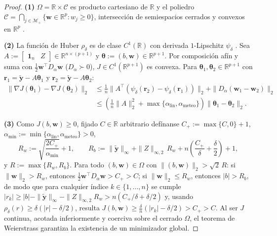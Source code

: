 \documentclass[11pt,a4paper]{article}
\begin{document}
\begin{proof}
\textbf{(1)} $\Omega = \mathbb{R} \times \mathcal{C}$ es producto cartesiano de $\mathbb{R}$ y el poliedro $\mathcal{C} = \bigcap_{j \in \mathcal{M}_+} \{\mathbf{w} \in \mathbb{R}^p : w_j \ge 0\}$, intersección de semiespacios cerrados y convexos en $\mathbb{R}^p$ \cite{boyd2004convex}.

\textbf{(2)} La función de Huber $\rho_\delta$ es de clase $C^1(\mathbb{R})$ con derivada $1$-Lipschitz $\psi_\delta$ \cite{huber1964}. Sea $A := \begin{bmatrix} \mathbf{1}_n & Z \end{bmatrix} \in \mathbb{R}^{n \times (p+1)}$ y $\boldsymbol{\theta} := (b, \mathbf{w}) \in \mathbb{R}^{p+1}$. Por composición afín y suma con $\frac{1}{2}\mathbf{w}^\top D_\alpha \mathbf{w}$ ($D_\alpha \succ 0$), $J \in C^1(\mathbb{R}^{p+1})$ es convexa. Para $\boldsymbol{\theta}_1, \boldsymbol{\theta}_2 \in \mathbb{R}^{p+1}$ con $\mathbf{r}_1 = \tilde{\mathbf{y}} - A\boldsymbol{\theta}_1$ y $\mathbf{r}_2 = \tilde{\mathbf{y}} - A\boldsymbol{\theta}_2$:
\begin{align*}
\|\nabla J(\boldsymbol{\theta}_1) - \nabla J(\boldsymbol{\theta}_2)\|_2
&\le \frac{1}{n}\|A^\top (\psi_\delta(\mathbf{r}_2) - \psi_\delta(\mathbf{r}_1))\|_2 + \|D_\alpha(\mathbf{w}_1 - \mathbf{w}_2)\|_2 \\
&\le \left(\frac{1}{n}\|A\|_2^2 + \max\{\alpha_{\mathrm{lin}}, \alpha_{\mathrm{meteo}}\}\right)\|\boldsymbol{\theta}_1 - \boldsymbol{\theta}_2\|_2.
\end{align*}

\textbf{(3)} Como $J(b,\mathbf{w}) \ge 0$, fijado $C \in \mathbb{R}$ arbitrario defínanse $C_+ := \max\{C, 0\} + 1$, $\alpha_{\min} := \min\{\alpha_{\mathrm{lin}}, \alpha_{\mathrm{meteo}}\} > 0$,
\[
R_w := \sqrt{\frac{2 C_+}{\alpha_{\min}}} + 1, \qquad
R_b := \|\tilde{\mathbf{y}}\|_\infty + \|Z\|_{\infty,2}\,R_w + n\left(\frac{C_+}{\delta} + \frac{\delta}{2}\right) + 1,
\]
y $R := \max\{R_w, R_b\}$. Para todo $(b, \mathbf{w}) \in \Omega$ con $\|(b, \mathbf{w})\|_2 > \sqrt{2}\,R$: si $\|\mathbf{w}\|_2 > R_w$, entonces $\frac{1}{2}\mathbf{w}^\top D_\alpha \mathbf{w} > C_+ > C$; si $\|\mathbf{w}\|_2 \le R_w$, entonces $|b| > R_b$, de modo que para cualquier índice $k \in \{1,\dots,n\}$ se cumple $|r_k| \ge |b| - \|\tilde{\mathbf{y}}\|_\infty - \|Z\|_{\infty,2} R_w > n(C_+/\delta + \delta/2)$ y, usando $\rho_\delta(r) \ge \delta(|r| - \delta/2)$, resulta $J(b, \mathbf{w}) \ge \frac{\delta}{n}(|r_k| - \delta/2) > C_+ > C$. Al ser $J$ continua, acotada inferiormente y coerciva sobre el cerrado $\Omega$, el teorema de Weierstrass garantiza la existencia de un minimizador global.
\end{proof}
\end{document}
